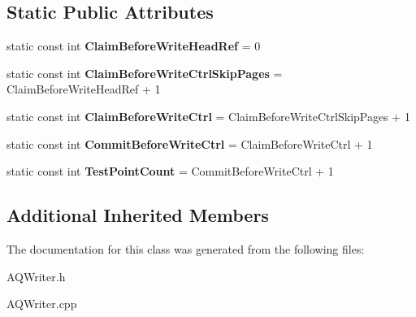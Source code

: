 \subsection*{Static Public Attributes}
\begin{DoxyCompactItemize}
\item 
static const int {\bfseries Claim\+Before\+Write\+Head\+Ref} = 0\hypertarget{class_a_q_writer_a3074dbe598b3a940d6ff60a0d4e2edd2}{}\label{class_a_q_writer_a3074dbe598b3a940d6ff60a0d4e2edd2}

\item 
static const int {\bfseries Claim\+Before\+Write\+Ctrl\+Skip\+Pages} = Claim\+Before\+Write\+Head\+Ref + 1\hypertarget{class_a_q_writer_a025b95cc9c443b0869389b89dbd0f174}{}\label{class_a_q_writer_a025b95cc9c443b0869389b89dbd0f174}

\item 
static const int {\bfseries Claim\+Before\+Write\+Ctrl} = Claim\+Before\+Write\+Ctrl\+Skip\+Pages + 1\hypertarget{class_a_q_writer_a18ec1b67b267790fe9fceb79a9fbf7b7}{}\label{class_a_q_writer_a18ec1b67b267790fe9fceb79a9fbf7b7}

\item 
static const int {\bfseries Commit\+Before\+Write\+Ctrl} = Claim\+Before\+Write\+Ctrl + 1\hypertarget{class_a_q_writer_a2057ecc1b059fcba2b5497fcfce4c104}{}\label{class_a_q_writer_a2057ecc1b059fcba2b5497fcfce4c104}

\item 
static const int {\bfseries Test\+Point\+Count} = Commit\+Before\+Write\+Ctrl + 1\hypertarget{class_a_q_writer_a8d574c3551be31f6ff288fd4757210ba}{}\label{class_a_q_writer_a8d574c3551be31f6ff288fd4757210ba}

\end{DoxyCompactItemize}
\subsection*{Additional Inherited Members}


The documentation for this class was generated from the following files\+:\begin{DoxyCompactItemize}
\item 
A\+Q\+Writer.\+h\item 
A\+Q\+Writer.\+cpp\end{DoxyCompactItemize}
